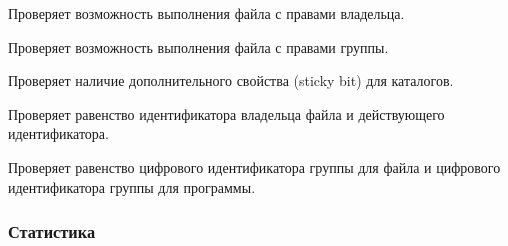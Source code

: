 \begin{methodlist}
  Проверяет возможность выполнения файла с правами владельца. 

  Проверяет возможность выполнения файла с правами группы. 

  Проверяет наличие дополнительного свойства (sticky bit) для каталогов. 

  Проверяет равенство идентификатора владельца файла и действующего идентификатора. 

  Проверяет равенство цифрового идентификатора группы для файла и цифрового идентификатора группы для программы.
\end{methodlist}

\subsubsection*{Статистика}

